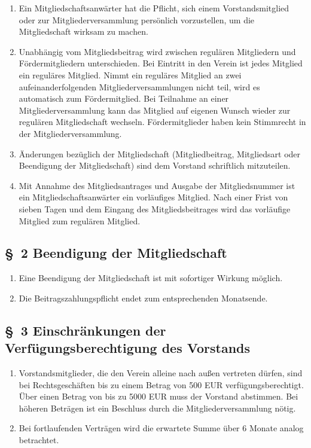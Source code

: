 \documentclass[10pt,a4paper]{scrartcl}
\begin{document}
\begin{enumerate}
    \item Ein Mitgliedschaftsanw{\"a}rter hat die Pflicht, sich einem Vorstandsmitglied oder zur 
    Mitgliederversammlung pers{\"o}nlich vorzustellen, um die Mitgliedschaft wirksam zu machen.
    \item Unabh{\"a}ngig vom Mitgliedsbeitrag wird zwischen regul{\"a}ren Mitgliedern und F{\"o}r\-der\-mit\-gliedern
    unterschieden. Bei Eintritt in den Verein ist jedes Mitglied ein regul{\"a}res Mitglied.
    Nimmt ein regul{\"a}res Mitglied an zwei aufeinanderfolgenden Mitgliederversammlungen nicht
    teil, wird es automatisch zum F{\"o}rdermitglied. Bei Teilnahme an einer Mitgliederversammlung
    kann das Mitglied auf eigenen Wunsch wieder zur regul{\"a}ren Mitgliedschaft wechseln.
    F{\"o}rdermitglieder haben kein Stimmrecht in der Mitgliederversammlung.

    
\item {\"A}nderungen bez{\"u}glich der Mitgliedschaft (Mitgliedbeitrag, Mitgliedsart oder Beendigung der Mitgliedschaft)
	sind dem Vorstand schriftlich mitzuteilen.
\item	Mit Annahme des Mitgliedsantrages und Ausgabe der
	Mitgliedsnummer ist ein Mitgliedschaftsanw{\"a}rter ein
	vorl{\"a}ufiges Mitglied. Nach einer Frist von sieben
	Tagen und dem Eingang des Mitgliedsbeitrages wird das
	vorl{\"a}ufige Mitglied zum regul{\"a}ren Mitglied.
\end{enumerate}
%
%
\subsection*{\S \ 2 Beendigung der Mitgliedschaft}
\begin{enumerate}
\item Eine Beendigung der Mitgliedschaft ist mit sofortiger Wirkung m{\"o}glich.
\item Die Beitragszahlungspflicht endet zum entsprechenden Monatsende.
\end{enumerate}
%
%
\subsection*{\S \ 3 Einschr{\"a}nkungen der Verf{\"u}gungsberechtigung des Vorstands}
\begin{enumerate}
\item Vorstandsmitglieder, die den Verein alleine nach au{\ss}en vertreten
    d{\"u}rfen, sind bei Rechtsgesch{\"a}ften bis zu einem Betrag von 500 EUR
    verf{\"u}gungsberechtigt. {\"U}ber einen Betrag von bis zu 5000 EUR muss der
    Vorstand abstimmen. Bei h{\"o}heren Betr{\"a}gen ist ein Beschluss durch die
    Mitgliederversammlung n{\"o}tig.
\item Bei fortlaufenden Vertr{\"a}gen wird die erwartete Summe
    {\"u}ber 6 Monate analog betrachtet.
\end{enumerate}
%
%
\end{document}
